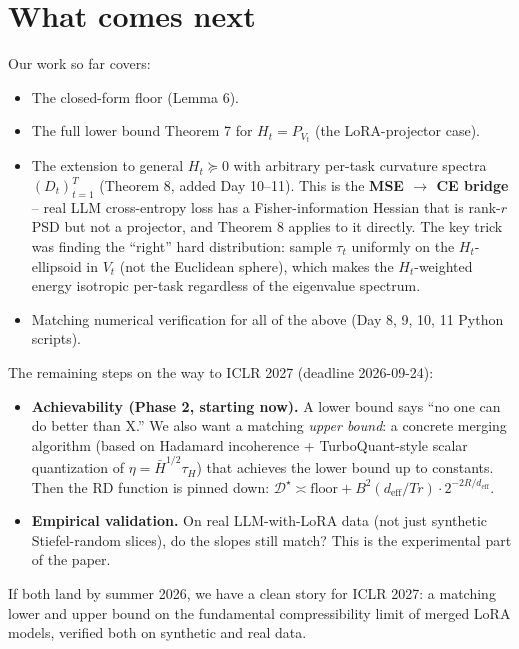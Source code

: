 \documentclass[11pt]{article}
\newcommand{\tauH}{\tau_{\!H}}
\newcommand{\deff}{d_{\mathrm{eff}}}
\begin{document}
\section{What comes next}

Our work so far covers:
\begin{itemize}[nosep]
  \item The closed-form floor (Lemma 6).
  \item The full lower bound Theorem 7 for $H_t = P_{V_t}$ (the
        LoRA-projector case).
  \item The extension to general $H_t \succeq 0$ with arbitrary
        per-task curvature spectra $(D_t)_{t=1}^T$
        (Theorem 8, added Day 10--11). This is the
        \textbf{MSE $\to$ CE bridge} -- real LLM cross-entropy
        loss has a Fisher-information Hessian that is rank-$r$ PSD
        but not a projector, and Theorem 8 applies to it directly.
        The key trick was finding the ``right'' hard distribution:
        sample $\tau_t$ uniformly on the $H_t$-ellipsoid in $V_t$
        (not the Euclidean sphere), which makes the $H_t$-weighted
        energy isotropic per-task regardless of the eigenvalue
        spectrum.
  \item Matching numerical verification for all of the above
        (Day 8, 9, 10, 11 Python scripts).
\end{itemize}

The remaining steps on the way to ICLR 2027 (deadline 2026-09-24):
\begin{itemize}[nosep]
  \item \textbf{Achievability (Phase 2, starting now).} A lower
        bound says ``no one can do better than X.'' We also want a
        matching \emph{upper bound}: a concrete merging algorithm
        (based on Hadamard incoherence + TurboQuant-style scalar
        quantization of $\eta = \bar H^{1/2}\tauH$) that achieves
        the lower bound up to constants. Then the RD function is
        pinned down: $\mathcal{D}^\star \asymp \text{floor} +
        B^2(\deff/Tr)\cdot 2^{-2R/\deff}$.
  \item \textbf{Empirical validation.} On real LLM-with-LoRA data
        (not just synthetic Stiefel-random slices), do the slopes
        still match? This is the experimental part of the paper.
\end{itemize}

If both land by summer 2026, we have a clean story for ICLR 2027:
a matching lower and upper bound on the fundamental compressibility
limit of merged LoRA models, verified both on synthetic and real data.
\end{document}
